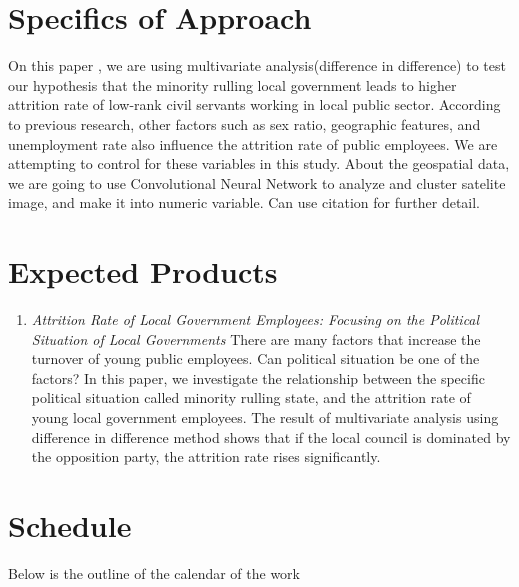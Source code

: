 \documentclass{tufte-handout}
\begin{document}
\section{Specifics of Approach}
On this paper , we are using multivariate analysis(difference in difference) to test our hypothesis that the minority rulling local government leads to higher attrition rate of low-rank civil servants working in local public sector. According to previous research, other factors such as sex ratio, geographic features, and unemployment rate also influence the attrition rate of public employees. We are attempting to control for these variables in this study. About the geospatial data, we are going to use Convolutional Neural Network to analyze and cluster satelite image, and make it into numeric variable. Can use citation\cite{Merowetal2014} for further detail.

\section{Expected Products}
\begin{enumerate}

\item \emph{Attrition Rate of Local Government Employees: Focusing on the Political Situation of Local Governments} There are many factors that increase the turnover of young public employees. Can political situation be one of the factors? In this paper, we investigate the relationship between the specific political situation called minority rulling state, and the attrition rate of young local government employees. The result of multivariate analysis using difference in difference method shows that if the local council is dominated by the opposition party, the attrition rate rises significantly.  

\end{enumerate}

\section{Schedule}
Below is the outline of the calendar of the work
\end{document}
